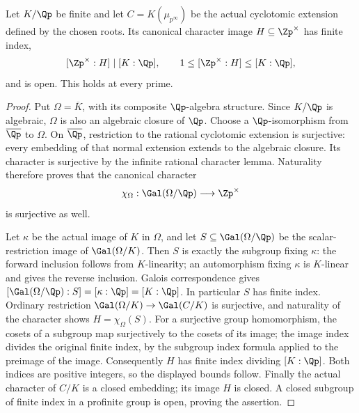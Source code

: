 \begin{lemma}
\label{ft:cyclotomic-image-open}
\leanok
Let $K/\Qp$ be finite and let $C=K(\mu_{p^\infty})$ be the
actual cyclotomic extension defined by the chosen roots. Its
canonical character image $H\subseteq\Zp^\times$ has finite index,
\[
 [\Zp^\times:H]\mid[K:\Qp],\qquad
 1\leq[\Zp^\times:H]\leq[K:\Qp],
\]
and is open. This holds at every prime.
\end{lemma}
\begin{proof}
Put $\Omega=\overline K$, with its composite $\Qp$-algebra
structure. Since $K/\Qp$ is algebraic, $\Omega$ is also an
algebraic closure of $\Qp$. Choose a $\Qp$-isomorphism from
$\overline{\Qp}$ to $\Omega$. On $\overline{\Qp}$, restriction
to the rational cyclotomic extension is surjective: every embedding
of that normal extension extends to the algebraic closure. Its
character is surjective by the infinite rational character lemma.
Naturality therefore proves that the canonical character
\[
 \chi_\Omega:\Gal(\Omega/\Qp)\longrightarrow\Zp^\times
\]
is surjective as well.

Let $\kappa$ be the actual image of $K$ in $\Omega$, and let
$S\subseteq\Gal(\Omega/\Qp)$ be the scalar-restriction image
of $\Gal(\Omega/K)$. Then $S$ is exactly the subgroup fixing
$\kappa$: the forward inclusion follows from $K$-linearity;
an automorphism fixing $\kappa$ is $K$-linear and gives the reverse
inclusion. Galois correspondence gives
$[\Gal(\Omega/\Qp):S]=[\kappa:\Qp]=[K:\Qp]$.
In particular $S$ has finite index.
Ordinary restriction $\Gal(\Omega/K)\to\Gal(C/K)$ is
surjective, and naturality of the character shows
$H=\chi_\Omega(S)$. For a surjective group homomorphism,
the cosets of a subgroup map surjectively to the cosets of its
image; the image index divides the original finite index, by
the subgroup index formula applied to the preimage of the image.
Consequently $H$ has finite index dividing $[K:\Qp]$.
Both indices are positive integers, so the displayed bounds follow.
Finally the actual character of $C/K$ is a closed embedding;
its image $H$ is closed. A closed subgroup of finite index in
a profinite group is open, proving the assertion.
\end{proof}

